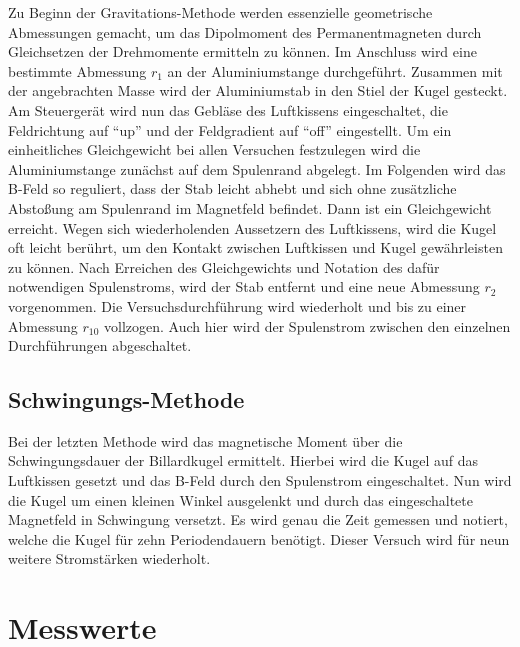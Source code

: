 \noindent Zu Beginn der Gravitations-Methode werden essenzielle geometrische Abmessungen gemacht, um das Dipolmoment des 
Permanentmagneten durch Gleichsetzen der Drehmomente ermitteln zu können. Im Anschluss wird eine bestimmte Abmessung $r_1$ 
an der Aluminiumstange durchgeführt. Zusammen mit der angebrachten Masse wird der Aluminiumstab in den Stiel der Kugel gesteckt. 
Am Steuergerät wird nun das Gebläse des Luftkissens eingeschaltet, die Feldrichtung auf \enquote{up} und der Feldgradient auf 
\enquote{off} eingestellt. Um ein einheitliches Gleichgewicht bei allen Versuchen festzulegen wird die Aluminiumstange zunächst auf 
dem Spulenrand abgelegt. Im Folgenden wird das B-Feld so reguliert, dass der Stab leicht abhebt und sich ohne zusätzliche 
Abstoßung am Spulenrand im Magnetfeld befindet. Dann ist ein Gleichgewicht erreicht. Wegen sich wiederholenden Aussetzern des 
Luftkissens, wird die Kugel oft leicht berührt, um den Kontakt zwischen Luftkissen und Kugel gewährleisten zu können.
Nach Erreichen des Gleichgewichts und Notation des dafür notwendigen Spulenstroms, wird der Stab entfernt und eine neue Abmessung 
$r_2$ vorgenommen. Die Versuchsdurchführung wird wiederholt und bis zu einer Abmessung $r_10$ vollzogen. Auch hier wird der 
Spulenstrom zwischen den einzelnen Durchführungen abgeschaltet.

\subsection{Schwingungs-Methode}

\noindent Bei der letzten Methode wird das magnetische Moment über die Schwingungsdauer der Billardkugel ermittelt. Hierbei wird
die Kugel auf das Luftkissen gesetzt und das B-Feld durch den Spulenstrom eingeschaltet. Nun wird die Kugel um einen kleinen Winkel 
ausgelenkt und durch das eingeschaltete Magnetfeld in Schwingung versetzt. Es wird genau die Zeit gemessen und notiert, welche 
die Kugel für zehn Periodendauern benötigt. Dieser Versuch wird für neun weitere Stromstärken wiederholt.

\section{Messwerte}

%

